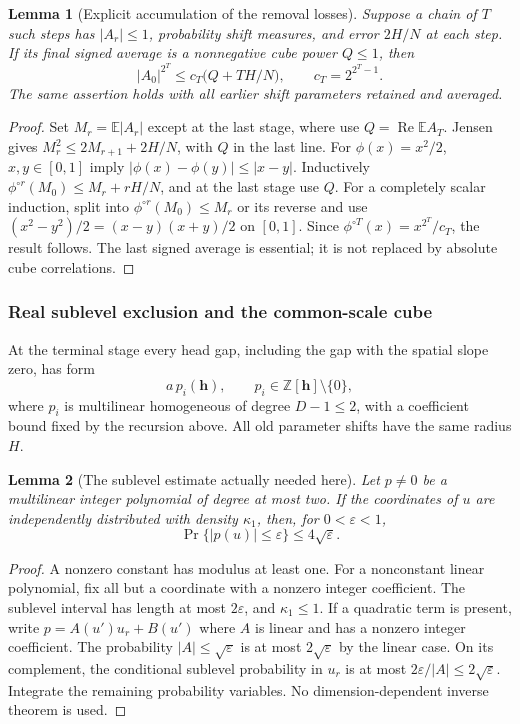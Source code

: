 \documentclass[11pt]{article}
\newtheorem{lemma}[lemma]{Lemma}
\theoremstyle{definition}
\begin{document}
\begin{lemma}[Explicit accumulation of the removal losses]\label{patch:cs-loss}
Suppose a chain of $T$ such steps has $|A_r|\leq1$, probability shift measures, and error
$2H/N$ at each step.  If its final signed average is a nonnegative cube power $Q\leq1$, then
\[
 |A_0|^{2^T}\leq c_T\bigl(Q+T H/N\bigr),\qquad c_T=2^{2^T-1}.
\]
The same assertion holds with all earlier shift parameters retained and averaged.
\end{lemma}
\begin{proof}
Set $M_r=\mathbb E|A_r|$ except at the last stage, where use $Q=\operatorname{Re}\mathbb E A_T$.
Jensen gives $M_r^2\leq2M_{r+1}+2H/N$, with $Q$ in the last line.
For $\phi(x)=x^2/2$, $x,y\in[0,1]$ imply
$|\phi(x)-\phi(y)|\leq|x-y|$.  Inductively
$\phi^{\circ r}(M_0)\leq M_r+rH/N$, and at the last stage use $Q$.
For a completely scalar induction, split into $\phi^{\circ r}(M_0)\leq M_r$ or its reverse
and use $(x^2-y^2)/2=(x-y)(x+y)/2$ on $[0,1]$.
Since $\phi^{\circ T}(x)=x^{2^T}/c_T$, the result follows.
The last signed average is essential; it is not replaced by absolute cube correlations.
\end{proof}

\subsubsection{Real sublevel exclusion and the common-scale cube}
At the terminal stage every head gap, including the gap with the spatial slope zero, has form
\[
 a\,p_i(\mathbf h),\qquad p_i\in\mathbb Z[\mathbf h]\setminus\{0\},
\]
where $p_i$ is multilinear homogeneous of degree $D-1\leq2$, with a coefficient bound fixed
by the recursion above.  All old parameter shifts have the same radius $H$.

\begin{lemma}[The sublevel estimate actually needed here]\label{patch:multiaffine-sublevel}
Let $p\ne0$ be a multilinear integer polynomial of degree at most two.  If the coordinates
of $u$ are independently distributed with density $\kappa_1$, then, for $0<\varepsilon<1$,
\[
 \Pr\{|p(u)|\leq\varepsilon\}\leq4\sqrt\varepsilon.
\]
\end{lemma}
\begin{proof}
A nonzero constant has modulus at least one.  For a nonconstant linear polynomial, fix all
but a coordinate with a nonzero integer coefficient.  The sublevel interval has length at
most $2\varepsilon$, and $\kappa_1\leq1$.
If a quadratic term is present, write $p=A(u')u_r+B(u')$ where $A$ is linear and has a
nonzero integer coefficient.  The probability $|A|\leq\sqrt\varepsilon$ is at most
$2\sqrt\varepsilon$ by the linear case.  On its complement, the conditional sublevel
probability in $u_r$ is at most $2\varepsilon/|A|\leq2\sqrt\varepsilon$.
Integrate the remaining probability variables.  No dimension-dependent inverse theorem is used.
\end{proof}
\end{document}

